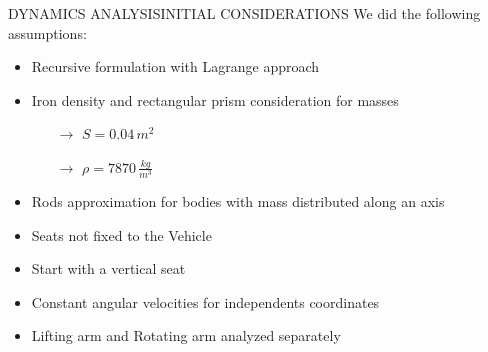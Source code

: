 \documentclass{beamer}              %
\begin{document}
	\begin{frame}{DYNAMICS ANALYSIS}{INITIAL CONSIDERATIONS}
		We did the following assumptions:
		
		\medskip 
		
		\begin{itemize}
			\item Recursive formulation with Lagrange approach
			\item Iron density and rectangular prism consideration for masses
			\begin{itemize}
				\item[$\rightarrow$] $S=0.04 \, m^2$
				\item[$\rightarrow$] $\rho=7870 \, \frac{kg}{m^3}$
			\end{itemize}
			\item Rods approximation for bodies with mass distributed along an axis
			\item Seats not fixed to the Vehicle
			\item Start with a vertical seat 
			\item Constant angular velocities for independents coordinates
			\item Lifting arm and Rotating arm analyzed separately
		\end{itemize}
	\end{frame}
\end{document}
